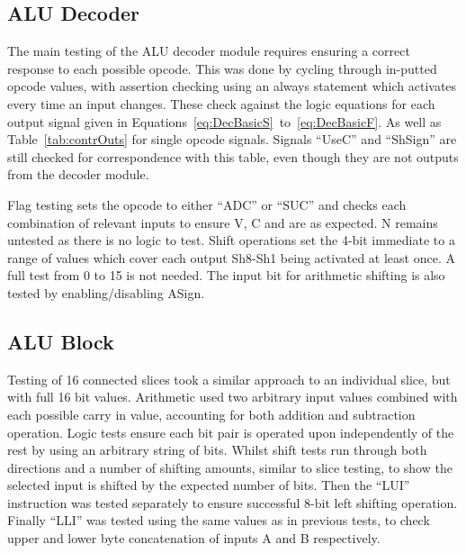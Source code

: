 \subsection{ALU Decoder}
The main testing of the ALU decoder module requires ensuring a correct response to each possible opcode. This was done by cycling through in-putted opcode values, with assertion checking using an always statement which activates every time an input changes. These check against the logic equations for each output signal given in Equations~\ref{eq:DecBasicS}~to~\ref{eq:DecBasicF}. As well as Table~\ref{tab:contrOuts} for single opcode signals. 
Signals ``UseC'' and ``ShSign'' are still checked for correspondence with this table, even though they are not outputs from the decoder module. 

Flag testing sets the opcode to either ``ADC'' or ``SUC'' and checks each combination of relevant inputs to ensure V, C and  are as expected. N remains untested as there is no logic to test. 
Shift operations set the 4-bit immediate to a range of values which cover each output Sh8-Sh1 being activated at least once. A full test from 0 to 15 is not needed. The input bit for arithmetic shifting is also tested by enabling/disabling ASign. 

\subsection{ALU Block}
Testing of 16 connected slices took a similar approach to an individual slice, but with full 16 bit values. Arithmetic used two arbitrary input values combined with each possible carry in value, accounting for both addition and subtraction operation. 
Logic tests ensure each bit pair is operated upon independently of the rest by using an arbitrary string of bits. 
Whilst shift tests run through both directions and a number of shifting amounts, similar to slice testing, to show the selected input is shifted by the expected number of bits. Then the ``LUI'' instruction was tested separately to ensure successful 8-bit left shifting operation. Finally ``LLI'' was tested using the same values as in previous tests, to check upper and lower byte concatenation of inputs A and B respectively. 